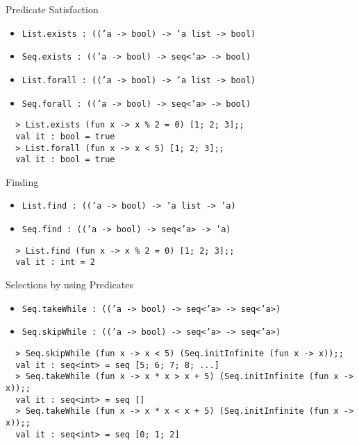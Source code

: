 \documentclass{beamer}
\begin{document}
\begin{frame}[fragile]{Predicate Satisfaction}
  \begin{itemize}
    \item \texttt{List.exists : (('a -> bool) -> 'a list -> bool)}
    \item \texttt{Seq.exists : (('a -> bool) -> seq<'a> -> bool)}
    \item \texttt{List.forall : (('a -> bool) -> 'a list -> bool)}
    \item \texttt{Seq.forall : (('a -> bool) -> seq<'a> -> bool)}
  \end{itemize}
  \begin{verbatim}
  > List.exists (fun x -> x % 2 = 0) [1; 2; 3];;
  val it : bool = true
  > List.forall (fun x -> x < 5) [1; 2; 3];;
  val it : bool = true
  \end{verbatim}
\end{frame}

\begin{frame}[fragile]{Finding}
  \begin{itemize}
    \item \texttt{List.find : (('a -> bool) -> 'a list -> 'a)}
    \item \texttt{Seq.find : (('a -> bool) -> seq<'a> -> 'a)}
  \end{itemize}
  \begin{verbatim}
  > List.find (fun x -> x % 2 = 0) [1; 2; 3];;
  val it : int = 2
  \end{verbatim}
\end{frame}

\begin{frame}[fragile]{Selections by using Predicates}
  \tiny
  \begin{itemize}
    \item \texttt{Seq.takeWhile : (('a -> bool) -> seq<'a> -> seq<'a>)}
    \item \texttt{Seq.skipWhile : (('a -> bool) -> seq<'a> -> seq<'a>)}
  \end{itemize}
  \begin{verbatim}
  > Seq.skipWhile (fun x -> x < 5) (Seq.initInfinite (fun x -> x));;
  val it : seq<int> = seq [5; 6; 7; 8; ...]
  > Seq.takeWhile (fun x -> x * x > x + 5) (Seq.initInfinite (fun x -> x));;
  val it : seq<int> = seq []
  > Seq.takeWhile (fun x -> x * x < x + 5) (Seq.initInfinite (fun x -> x));;
  val it : seq<int> = seq [0; 1; 2]
  \end{verbatim}
\end{frame}
\end{document}
